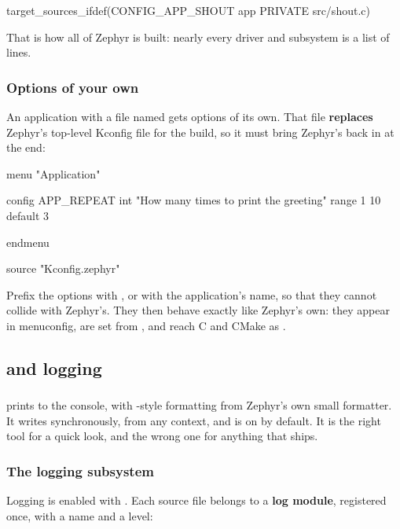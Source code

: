 \begin{cmakecode}
target_sources_ifdef(CONFIG_APP_SHOUT app PRIVATE src/shout.c)
\end{cmakecode}

\noindent That is how all of Zephyr is built: nearly every driver and subsystem is a list of
 lines.

\subsubsection{Options of your own}
An application with a file named  gets options of its own. That file \textbf{replaces}
Zephyr’s top-level Kconfig file for the build, so it must bring Zephyr’s back in at the end:

\begin{kconfigcode}
menu "Application"

config APP_REPEAT
	int "How many times to print the greeting"
	range 1 10
	default 3

endmenu

source "Kconfig.zephyr"
\end{kconfigcode}

\noindent Prefix the options with , or with the application’s name, so that they cannot
collide with Zephyr’s. They then behave exactly like Zephyr’s own: they appear in menuconfig, are
set from , and reach C and CMake as .

\subsection{ and logging}

\subsubsection{}
 prints to the console, with -style formatting from Zephyr’s own small
formatter. It writes synchronously, from any context, and is on by default. It is the right tool for
a quick look, and the wrong one for anything that ships.

\subsubsection{The logging subsystem}
Logging is enabled with . Each source file belongs to a \textbf{log module},
registered once, with a name and a level:


